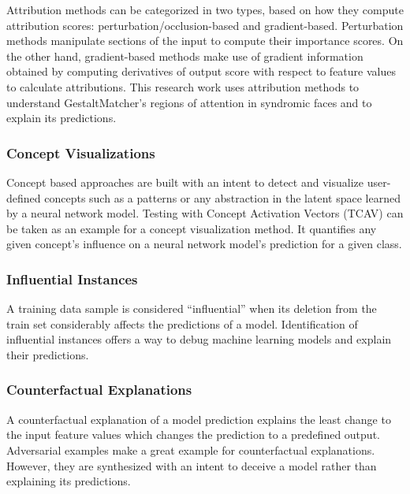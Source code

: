 \documentclass[../report.tex]{subfiles}
\begin{document}
	Attribution methods can be categorized in two types, based on how they compute attribution scores:  perturbation/occlusion-based and gradient-based. Perturbation methods manipulate sections of the input to compute their importance scores. On the other hand, gradient-based methods make use of gradient information obtained by computing derivatives of output score with respect to feature values to calculate attributions. This research work uses attribution methods to understand GestaltMatcher's regions of attention in syndromic faces and to explain its predictions.
	\subsubsection{Concept Visualizations}
	Concept based approaches are built with an intent to detect and visualize user-defined concepts such as a patterns or any abstraction in the latent space learned by a neural network model.  Testing with Concept Activation Vectors (TCAV) \cite{tcav} can be taken as an example for a concept visualization method. It quantifies any given concept's influence on a neural network model's prediction for a given class.
	
	\subsubsection{Influential Instances}
	A training data sample is considered \enquote{influential} when its deletion from the train set considerably affects the predictions of a model. Identification of influential instances offers a way to debug machine learning models and explain their predictions.
	
	\subsubsection{Counterfactual Explanations}
	A counterfactual explanation of a model prediction explains the least change to the input feature values which changes the prediction to a predefined output. Adversarial examples \cite{} make a great example for counterfactual explanations. However, they are synthesized with an intent to deceive a model rather than explaining its predictions.
\end{document}
